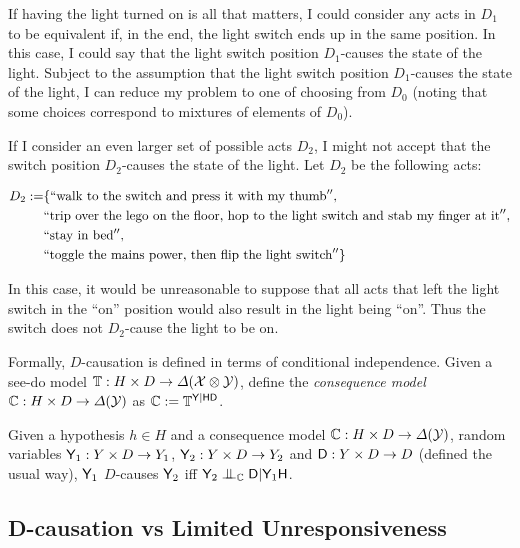 If having the light turned on is all that matters, I could consider any acts in $D_1$ to be equivalent if, in the end, the light switch ends up in the same position. In this case, I could say that the light switch position $D_1$-causes the state of the light. Subject to the assumption that the light switch position $D_1$-causes the state of the light, I can reduce my problem to one of choosing from $D_0$ (noting that some choices correspond to mixtures of elements of $D_0$).

If I consider an even larger set of possible acts $D_2$, I might not accept that the switch position $D_2$-causes the state of the light. Let $D_2$ be the following acts:

\begin{align*}
D_2:=&\{``\text{walk to the switch and press it with my thumb}'', \\
    &``\text{trip over the lego on the floor, hop to the light switch and stab my finger at it}'',\\
    &``\text{stay in bed}'',\\
    &``\text{toggle the mains power, then flip the light switch}''\}
\end{align*}

In this case, it would be unreasonable to suppose that all acts that left the light switch in the ``on'' position would also result in the light being ``on''. Thus the switch does not $D_2$-cause the light to be on.

Formally, $D$-causation is defined in terms of conditional independence. Given a see-do model $\mathbb{T}:H\times D\to \Delta(\mathcal{X}\otimes\mathcal{Y})$, define the \emph{consequence model} $\mathbb{C}:H\times D\to \Delta(\mathcal{Y})$ as $\mathbb{C}:=\mathbb{T}^{\mathsf{Y}|\mathsf{H}\mathsf{D}}$.

\begin{definition}[$D$-causation]\label{def:d_cause}
Given a hypothesis $h\in H$ and a consequence model $\mathbb{C}:H\times D\to \Delta(\mathcal{Y})$, random variables $\mathsf{Y}_1:Y\times D\to Y_1$, $\mathsf{Y}_2:Y\times D\to Y_2$ and $\mathsf{D}:Y\times D\to D$ (defined the usual way), $\mathsf{Y}_1$ $D$-causes $\mathsf{Y}_2$ iff $\RV{Y}_2\CI_{\kernel{C}} \RV{D}|\RV{Y}_1\RV{H}$.
\end{definition}

\subsection{D-causation vs Limited Unresponsiveness}


